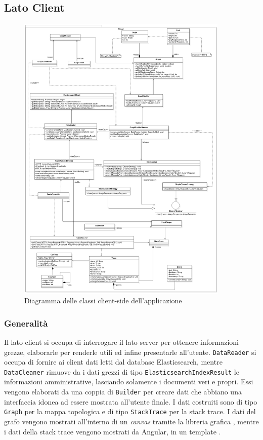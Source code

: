 \subsection{Lato Client}
\label{sec:latoClient}
\begin{figure}[H]
    \centering
    \includegraphics[width=0.9\textwidth]{Images/classi.png}
    \caption{Diagramma delle classi client-side dell'applicazione}
    \label{img:diagrammaClassiClient}
\end{figure}
\subsubsection{Generalità}
Il lato client si occupa di interrogare il lato server per ottenere informazioni grezze, elaborarle per renderle utili ed infine presentarle all'utente. \texttt{DataReader} si occupa di fornire ai client dati letti dal database Elasticsearch, mentre \texttt{DataCleaner} rimuove da i dati grezzi di tipo \texttt{ElasticsearchIndexResult} le informazioni amministrative, lasciando solamente i documenti veri e propri. Essi vengono elaborati da una coppia di \texttt{Builder} per creare dati che abbiano una interfaccia idonea ad essere mostrata all'utente finale. I dati costruiti sono di tipo \texttt{Graph} per la mappa topologica e di tipo \texttt{StackTrace} per la stack trace. I dati del grafo vengono mostrati all'interno di un \emph{canvas} tramite la libreria grafica , mentre i dati della stack trace vengono mostrati da Angular, in un template . 


